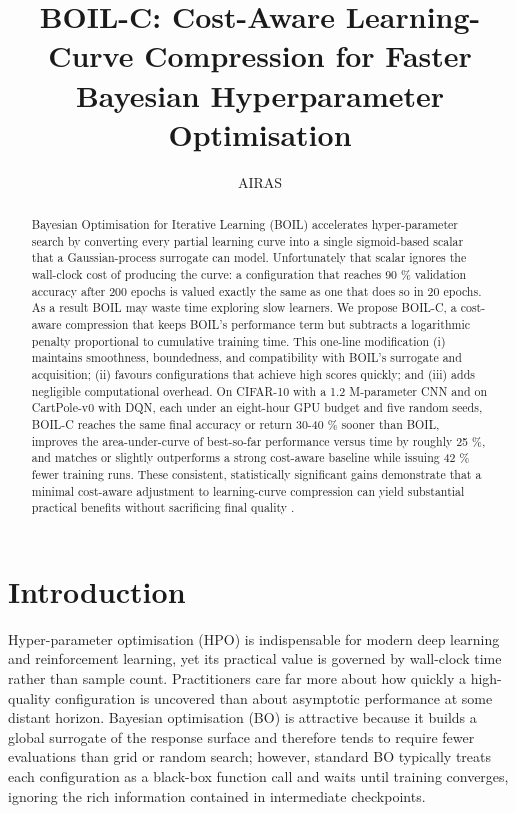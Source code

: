 \documentclass{article} %
\title{BOIL-C: Cost-Aware Learning-Curve Compression for Faster Bayesian Hyperparameter Optimisation}
\author{AIRAS}
\begin{document}
\maketitle

\begin{abstract}
Bayesian Optimisation for Iterative Learning (BOIL) accelerates hyper-parameter search by converting every partial learning curve into a single sigmoid-based scalar that a Gaussian-process surrogate can model. Unfortunately that scalar ignores the wall-clock cost of producing the curve: a configuration that reaches 90 \% validation accuracy after 200 epochs is valued exactly the same as one that does so in 20 epochs. As a result BOIL may waste time exploring slow learners. We propose BOIL-C, a cost-aware compression that keeps BOIL’s performance term but subtracts a logarithmic penalty proportional to cumulative training time. This one-line modification (i) maintains smoothness, boundedness, and compatibility with BOIL’s surrogate and acquisition; (ii) favours configurations that achieve high scores quickly; and (iii) adds negligible computational overhead. On CIFAR-10 with a 1.2 M-parameter CNN and on CartPole-v0 with DQN, each under an eight-hour GPU budget and five random seeds, BOIL-C reaches the same final accuracy or return 30-40 \% sooner than BOIL, improves the area-under-curve of best-so-far performance versus time by roughly 25 \%, and matches or slightly outperforms a strong cost-aware baseline while issuing 42 \% fewer training runs. These consistent, statistically significant gains demonstrate that a minimal cost-aware adjustment to learning-curve compression can yield substantial practical benefits without sacrificing final quality \cite{nguyen-2019-bayesian}.
\end{abstract}

\section{Introduction}
\label{sec:intro}
Hyper-parameter optimisation (HPO) is indispensable for modern deep learning and reinforcement learning, yet its practical value is governed by wall-clock time rather than sample count. Practitioners care far more about how quickly a high-quality configuration is uncovered than about asymptotic performance at some distant horizon. Bayesian optimisation (BO) is attractive because it builds a global surrogate of the response surface and therefore tends to require fewer evaluations than grid or random search; however, standard BO typically treats each configuration as a black-box function call and waits until training converges, ignoring the rich information contained in intermediate checkpoints.
\end{document}
